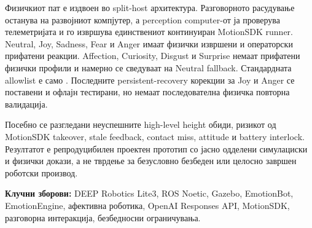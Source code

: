 Физичкиот пат е издвоен во split-host архитектура. Разговорното расудување
останува на развојниот компјутер, а perception computer-от ја проверува
телеметријата и го извршува единствениот континуиран MotionSDK runner. Neutral,
Joy, Sadness, Fear и Anger имаат физички извршени и операторски прифатени
реакции. Affection, Curiosity, Disgust и Surprise немаат прифатени физички
профили и намерно се сведуваат на Neutral fallback. Стандардната allowlist е
само . Последните persistent-recovery корекции за Joy и Anger се
поставени и офлајн тестирани, но немаат последователна физичка повторна
валидација.

Посебно се разгледани неуспешните high-level height обиди, ризикот од
MotionSDK takeover, stale feedback, contact miss, attitude и battery interlock.
Резултатот е репродуцибилен проектен прототип со јасно одделени
симулациски и физички докази, а не тврдење за безусловно безбеден или целосно
завршен роботски производ.

\noindent\textbf{Клучни зборови:} DEEP Robotics Lite3, ROS Noetic, Gazebo,
EmotionBot, EmotionEngine, афективна роботика, OpenAI Responses API, MotionSDK,
разговорна интеракција, безбедносни ограничувања.


